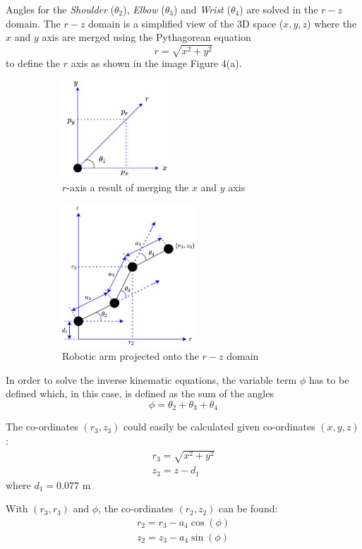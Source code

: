 \documentclass[9pt, a4paper]{article}
\begin{document}
Angles for the \textit{Shoulder} ($\theta_2$), \textit{Elbow} ($\theta_3$) and
\textit{Wrist} ($\theta_4$) are solved in the $r-z$ domain. The $r-z$ domain is
a simplified view of the 3D space ($x,y,z$) where the $x$ and $y$ axis are
merged using the Pythagorean equation 
$$
  r = \sqrt{x^2 + y^2}
$$
to define the $r$ axis as shown in the image Figure 4(a).
\begin{figure}[h]
  \centering
  \begin{subfigure}{.5\textwidth}
    \centering
    \includegraphics[width=4cm]{r.JPG}
    \caption{$r$-axis a result of merging the $x$ and $y$ axis}
  \end{subfigure}%
  \begin{subfigure}{.5\textwidth}
    \centering
    \includegraphics[width=5cm]{arm r domain.JPG}
    \caption{Robotic arm projected onto the $r-z$ domain}
  \end{subfigure}
  \caption{\cite{Coordinate_frame}}
\end{figure}

In order to solve the inverse kinematic equations, the variable term $\phi$ has
to be defined which, in this case, is defined as the sum of the angles
$$
  \phi = \theta_2 + \theta_3 + \theta_4
$$

The co-ordinates $(r_3, z_3)$ could easily be calculated given co-ordinates $(x,
y, z)$:
\begin{gather*}
  r_3 = \sqrt{x^2 + y^2} \\ 
  z_3 = z - d_1
\end{gather*}
where $d_1 = 0.077$ m

With $(r_3, r_3)$ and $\phi$, the co-ordinates $(r_2, z_2)$ can be found:
\begin{gather*}
  r_2 = r_3 - a_4 \cos(\phi) \\ 
  z_2 = z_3 - a_4 \sin(\phi)
\end{gather*}
\end{document}
